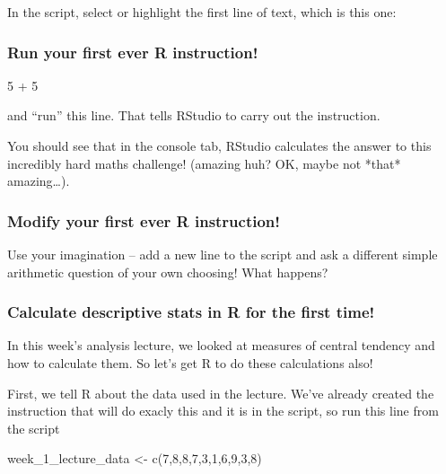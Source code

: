 \documentclass[
]{book}
\newenvironment{Shaded}{\begin{snugshade}}{\end{snugshade}}
\newcommand{\DecValTok}[1]{\textcolor[rgb]{0.00,0.00,0.81}{#1}}
\newcommand{\FunctionTok}[1]{\textcolor[rgb]{0.00,0.00,0.00}{#1}}
\newcommand{\NormalTok}[1]{#1}
\newcommand{\OtherTok}[1]{\textcolor[rgb]{0.56,0.35,0.01}{#1}}
\newcommand{\SpecialCharTok}[1]{\textcolor[rgb]{0.00,0.00,0.00}{#1}}
\begin{document}
In the script, select or highlight the first line of text, which is this one:

\hypertarget{run-your-first-ever-r-instruction}{%
\subsubsection{Run your first ever R instruction!}\label{run-your-first-ever-r-instruction}}

\begin{Shaded}
\begin{Highlighting}[]
\DecValTok{5} \SpecialCharTok{+} \DecValTok{5}
\end{Highlighting}
\end{Shaded}

and ``run'' this line. That tells RStudio to carry out the instruction.

You should see that in the console tab, RStudio calculates the answer to this incredibly hard maths challenge! (amazing huh? OK, maybe not *that* amazing\ldots).

\hypertarget{modify-your-first-ever-r-instruction}{%
\subsubsection{Modify your first ever R instruction!}\label{modify-your-first-ever-r-instruction}}

Use your imagination -- add a new line to the script and ask a different simple arithmetic question of your own choosing! What happens?

\hypertarget{calculate-descriptive-stats-in-r-for-the-first-time}{%
\subsubsection{Calculate descriptive stats in R for the first time!}\label{calculate-descriptive-stats-in-r-for-the-first-time}}

In this week's analysis lecture, we looked at measures of central tendency and how to calculate them. So let's get R to do these calculations also!

First, we tell R about the data used in the lecture. We've already created the instruction that will do exacly this and it is in the script, so run this line from the script

\begin{Shaded}
\begin{Highlighting}[]
\NormalTok{week\_1\_lecture\_data }\OtherTok{\textless{}{-}} \FunctionTok{c}\NormalTok{(}\DecValTok{7}\NormalTok{,}\DecValTok{8}\NormalTok{,}\DecValTok{8}\NormalTok{,}\DecValTok{7}\NormalTok{,}\DecValTok{3}\NormalTok{,}\DecValTok{1}\NormalTok{,}\DecValTok{6}\NormalTok{,}\DecValTok{9}\NormalTok{,}\DecValTok{3}\NormalTok{,}\DecValTok{8}\NormalTok{)}
\end{Highlighting}
\end{Shaded}
\end{document}

